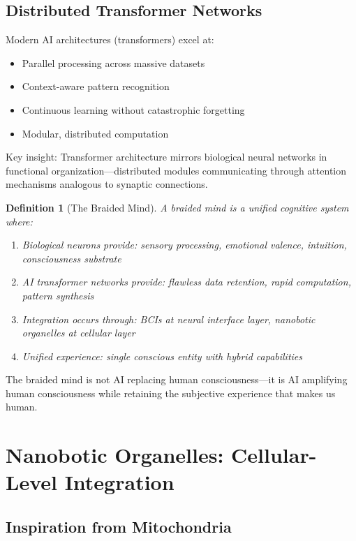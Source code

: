 \documentclass[reprint, amsmath, amssymb, aps, prd]{revtex4-2}
\newtheorem{definition}{Definition}[section]
\begin{document}
\subsection{Distributed Transformer Networks}

Modern AI architectures (transformers) excel at:
\begin{itemize}
    \item Parallel processing across massive datasets
    \item Context-aware pattern recognition
    \item Continuous learning without catastrophic forgetting
    \item Modular, distributed computation
\end{itemize}

Key insight: Transformer architecture mirrors biological neural networks in functional organization---distributed modules communicating through attention mechanisms analogous to synaptic connections.

\begin{definition}[The Braided Mind]
A braided mind is a unified cognitive system where:
\begin{enumerate}
    \item Biological neurons provide: sensory processing, emotional valence, intuition, consciousness substrate
    \item AI transformer networks provide: flawless data retention, rapid computation, pattern synthesis
    \item Integration occurs through: BCIs at neural interface layer, nanobotic organelles at cellular layer
    \item Unified experience: single conscious entity with hybrid capabilities
\end{enumerate}
\end{definition}

The braided mind is not AI replacing human consciousness---it is AI amplifying human consciousness while retaining the subjective experience that makes us human.

\section{Nanobotic Organelles: Cellular-Level Integration}

\subsection{Inspiration from Mitochondria}
\end{document}
